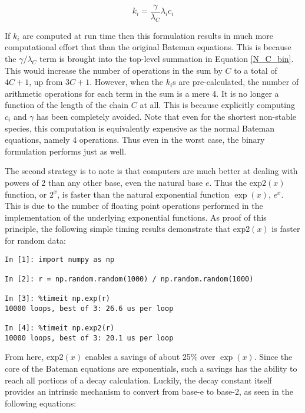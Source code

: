\documentclass{anstrans}
\begin{document}
\begin{equation}
\label{k_i}
k_i = \frac{\gamma}{\lambda_C} \lambda_i c_i
\end{equation}

If $k_i$ are computed at run time then this formulation results in much 
more computational effort that than the original Bateman equations. This is 
because the $\gamma/\lambda_C$ term is brought into the top-level summation 
in Equation \ref{N_C_bin}. This would increase the number of operations in the 
sum by $C$ to a total of $4C+1$, up from $3C+1$.
However, when the $k_i$s  are pre-calculated, 
the number of arithmetic operations for each term in the sum is a mere 4.
It is no longer a function of the length of the chain $C$ at all.  This is 
because explicitly computing $c_i$ and $\gamma$ has been completely avoided.
Note that even for the shortest non-stable species, this computation is 
equivalently expensive as the normal Bateman equations, namely 4 operations.
Thus even in the worst case, the binary formulation performs just as well.

The second strategy is to note is that computers are much better at dealing 
with powers of 2 than any other base, even the natural base $e$. Thus the 
$\mathrm{exp2}(x)$ function, or $2^x$, is faster than the natural exponential 
function $\exp(x)$, $e^x$.  This is due to the number of floating point
operations performed in the implementation of the underlying exponential 
functions. As proof of this principle, the following simple timing results
demonstrate that $\mathrm{exp2}(x)$ is faster for random data:

\begin{lstlisting}[caption={Exponential Timing Comparison}, 
                   label=expcmp]
In [1]: import numpy as np

In [2]: r = np.random.random(1000) / np.random.random(1000)

In [3]: %timeit np.exp(r)
10000 loops, best of 3: 26.6 us per loop

In [4]: %timeit np.exp2(r)
10000 loops, best of 3: 20.1 us per loop
\end{lstlisting}

From here, $\mathrm{exp2}(x)$ enables a savings of about 25\% over 
$\exp(x)$.  Since the core of the Bateman equations are exponentials, 
such a savings has the ability to reach all portions of a decay calculation.
Luckily, the decay constant itself provides an intrinsic mechanism to convert 
from base-e to base-2, as seen in the following equations:
\end{document}
